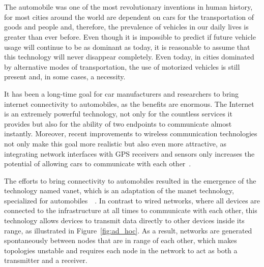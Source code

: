 
%

\chapter[Vehicular Ad hoc Networks]{} %
\label{cha:vehicular_networks}

The automobile was one of the most revolutionary inventions in human history, for most cities around the world are dependent on cars for the transportation of goods and people and, therefore, the prevalence of vehicles in our daily lives is greater than ever before. Even though it is impossible to predict if future vehicle usage will continue to be as dominant as today, it is reasonable to assume that this technology will never disappear completely. Even today, in cities dominated by alternative modes of transportation, the use of motorized vehicles is still present and, in some cases, a necessity.

It has been a long-time goal for car manufacturers and researchers to bring internet connectivity to automobiles, as the benefits are enormous. The Internet is an extremely powerful technology, not only for the countless services it provides but also for the ability of two endpoints to communicate almost instantly. Moreover, recent improvements to wireless communication technologies not only make this goal more realistic but also even more attractive, as integrating network interfaces with GPS receivers and sensors only increases the potential of allowing cars to communicate with each other~\cite{jakubiak_state_2008}.

The efforts to bring connectivity to automobiles resulted in the emergence of the technology named \gls{vanet}, which is an adaptation of the \gls{manet} technology, specialized for automobiles~\cite{al-sultan_comprehensive_2014}~\cite{liang_vehicular_2015}. In contrast to wired networks, where all devices are connected to the infrastructure at all times to communicate with each other, this technology allows devices to transmit data directly to other devices inside its range, as illustrated in Figure~\ref{fig:ad_hoc}. As a result, networks are generated spontaneously between nodes that are in range of each other, which makes topologies unstable and requires each node in the network to act as both a transmitter and a receiver. 

